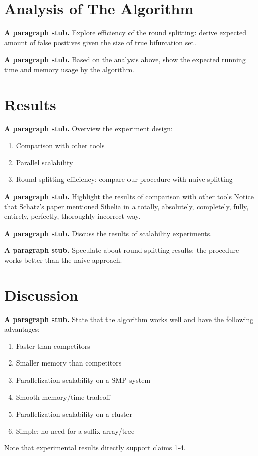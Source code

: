 \documentclass{llncs}
\newcommand{\stub}{\textbf{A paragraph stub. }}
\begin{document}
\section{Analysis of The Algorithm}

\stub Explore efficiency of the round splitting: derive expected amount of false positives given the size of true bifurcation set.

\stub Based on the analysis above, show the expected running time and memory usage by the algorithm.

\section{Results}
\stub Overview the experiment design:

\begin{enumerate}
	\item Comparison with other tools
	\item Parallel scalability
	\item Round-splitting efficiency: compare our procedure with naive splitting
\end{enumerate}

\stub Highlight the results of comparison with other tools
Notice that Schatz's paper mentioned Sibelia in a totally, absolutely, completely, fully, entirely, perfectly, thoroughly incorrect way.

\stub Discuss the results of scalability experiments.

\stub Speculate about round-splitting results: the procedure works better than the naive approach.

\section{Discussion}

\stub State that the algorithm works well and have the following advantages:
\begin{enumerate}
	\item Faster than competitors
	\item Smaller memory than competitors
	\item Parallelization scalability on a SMP system
	\item Smooth memory/time tradeoff
	\item Parallelization scalability on a cluster
	\item Simple: no need for a suffix array/tree
\end{enumerate}
Note that experimental results directly support claims 1-4.
\end{document}
